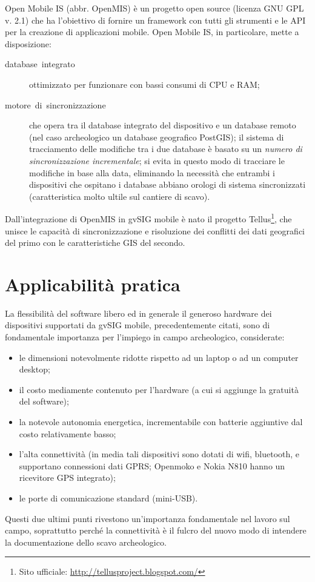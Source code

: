 	Open Mobile IS (abbr. OpenMIS) è un progetto open source (licenza GNU GPL v. 2.1) che ha l'obiettivo di fornire un framework con tutti gli strumenti e le API per la creazione di applicazioni mobile. Open Mobile IS, in particolare, mette a disposizione:
	
	\begin{description}
		\item [{database~integrato}] ottimizzato per funzionare con bassi consumi di CPU e RAM;
		\item [{motore~di~sincronizzazione}] che opera tra il database integrato del dispositivo e un database remoto (nel caso archeologico un database geografico PostGIS); il sistema di tracciamento delle modifiche tra i due database è basato su un \emph{numero di sincronizzazione incrementale}; si evita in questo modo di tracciare le modifiche in base alla data, eliminando la necessità che entrambi i dispositivi che ospitano i database abbiano orologi di sistema sincronizzati (caratteristica molto ultile sul cantiere di scavo).
	\end{description}
	
	Dall'integrazione di OpenMIS in gvSIG mobile è nato il progetto Tellus\footnote{Sito ufficiale: \href{http://tellusproject.blogspot.com/}{http://tellusproject.blogspot.com/}}, che unisce le capacità di sincronizzazione e risoluzione dei conflitti dei dati geografici del primo con le caratteristiche GIS del secondo.

\section{Applicabilità pratica}
	La flessibilità del software libero ed in generale il generoso hardware dei dispositivi supportati da gvSIG mobile, precedentemente citati, sono di fondamentale importanza per l'impiego in campo archeologico, considerate:
	
	\begin{itemize}
		\item le dimensioni notevolmente ridotte rispetto ad un laptop o ad un computer desktop;
		\item il costo mediamente contenuto per l'hardware (a cui si aggiunge la gratuità del software);
		\item la notevole autonomia energetica, incrementabile con batterie aggiuntive dal costo relativamente basso;
		\item l'alta connettività (in media tali dispositivi sono dotati di wifi, bluetooth, e supportano connessioni dati GPRS; Openmoko e Nokia N810 hanno un ricevitore GPS integrato);
		\item le porte di comunicazione standard (mini-USB).
	\end{itemize}
	Questi due ultimi punti rivestono un'importanza fondamentale nel lavoro sul campo, soprattutto perché la connettività è il fulcro del nuovo modo di intendere la documentazione dello scavo archeologico.\\

